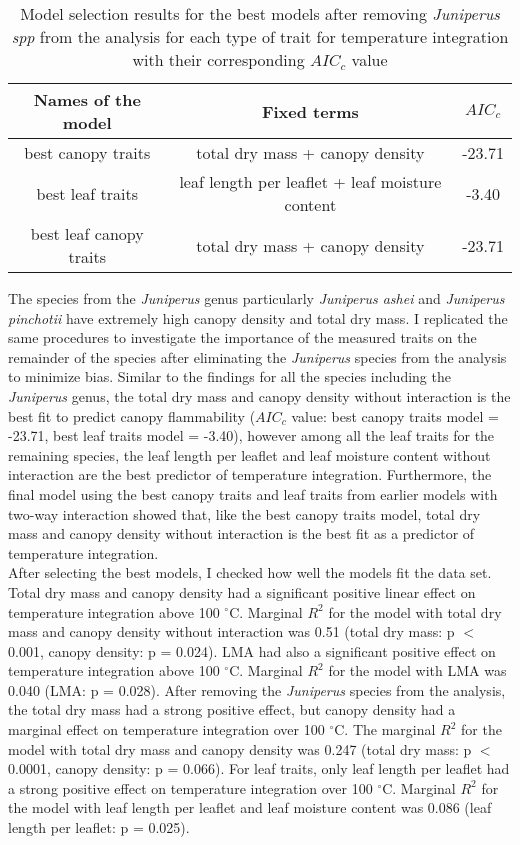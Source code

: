 \documentclass[12pt]{report}
\begin{document}
\begin{table}
\centering
\begin{tabular}{|c | c | c|}
       \hline
       \textbf{Names of the model} & \textbf{Fixed terms} & \textbf{$AIC_{c}$} \\
       \hline
       best canopy traits  &total dry mass + canopy density & -23.71 \\
       \hline
       best leaf traits    & leaf length per leaflet + leaf moisture content & -3.40 \\
       \hline
       best leaf canopy traits   & total dry mass + canopy density & -23.71\\
       \hline
\end{tabular}
\caption{Model selection results for the best models after removing \emph{Juniperus spp} from the  analysis for each type of trait for temperature integration with their corresponding  $AIC_{c}$ value}
\end{table} 


The species from the \emph{Juniperus} genus particularly \emph{Juniperus ashei} and \emph{Juniperus pinchotii} have extremely high canopy density and total dry mass. I replicated the same procedures to investigate the importance of the measured traits on the remainder of the species after eliminating the \emph{Juniperus} species from the analysis to minimize bias. Similar to the findings for all the species including the \emph{Juniperus} genus, the total dry mass and canopy density without interaction is the best fit to predict canopy flammability ($AIC_{c}$ value: best canopy traits model = -23.71, best leaf traits model = -3.40), however among all the leaf traits for the remaining species, the leaf length per leaflet and leaf moisture content without interaction are the best predictor of temperature integration. Furthermore, the final model using the best canopy traits and leaf traits from earlier models with two-way interaction showed that, like the best canopy traits model, total dry mass and canopy density without interaction is the best fit as a predictor of temperature integration.\\

After selecting the best models, I checked how well the models fit the data set. Total dry mass and canopy density had a significant positive linear effect on temperature integration above 100 $^{\circ}$C. Marginal $R^2$ for the model with total dry mass and canopy density without interaction was 0.51 (total dry mass: p $<$ 0.001, canopy density: p = 0.024). LMA had also a significant positive effect on temperature integration above 100 $^{\circ}$C. Marginal $R^2$ for the model with LMA was 0.040 (LMA: p = 0.028). After removing the \emph{Juniperus} species from the analysis, the total dry mass had a strong positive effect, but canopy density had a marginal effect on temperature integration over 100 $^{\circ}$C. The marginal $R^2$ for the model with total dry mass and canopy density was 0.247 (total dry mass: p $<$ 0.0001, canopy density: p = 0.066). For leaf traits, only leaf length per leaflet had a strong positive effect on temperature integration over 100 $^{\circ}$C.  Marginal $R^2$ for the model with leaf length per leaflet and leaf moisture content was 0.086 (leaf length per leaflet: p = 0.025).
\end{document}
